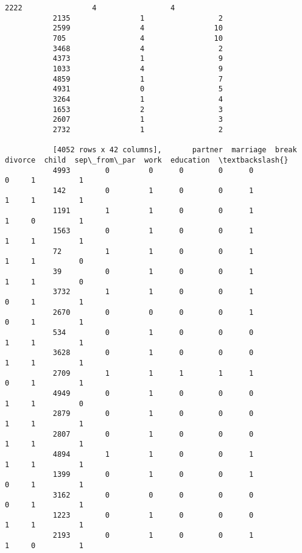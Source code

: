 \documentclass[11pt]{article}
\begin{document}
\begin{Verbatim}[commandchars=\\\{\}]
           2222                4                 4  
           2135                1                 2  
           2599                4                10  
           705                 4                10  
           3468                4                 2  
           4373                1                 9  
           1033                4                 9  
           4859                1                 7  
           4931                0                 5  
           3264                1                 4  
           1653                2                 3  
           2607                1                 3  
           2732                1                 2  
           
           [4052 rows x 42 columns],       partner  marriage  break  divorce  child  sep\_from\_par  work  education  \textbackslash{}
           4993        0         0      0        0      0             0     1          1   
           142         0         1      0        0      1             1     1          1   
           1191        1         1      0        0      1             1     0          1   
           1563        0         1      0        0      1             1     1          1   
           72          1         1      0        0      1             1     1          0   
           39          0         1      0        0      1             1     1          0   
           3732        1         1      0        0      1             0     1          1   
           2670        0         0      0        0      1             0     1          1   
           534         0         1      0        0      0             1     1          1   
           3628        0         1      0        0      0             1     1          1   
           2709        1         1      1        1      1             0     1          1   
           4949        0         1      0        0      0             1     1          0   
           2879        0         1      0        0      0             1     1          1   
           2807        0         1      0        0      0             1     1          1   
           4894        1         1      0        0      1             1     1          1   
           1399        0         1      0        0      1             0     1          1   
           3162        0         0      0        0      0             0     1          1   
           1223        0         1      0        0      0             1     1          1   
           2193        0         1      0        0      1             1     0          1   

\end{Verbatim}
\end{document}

